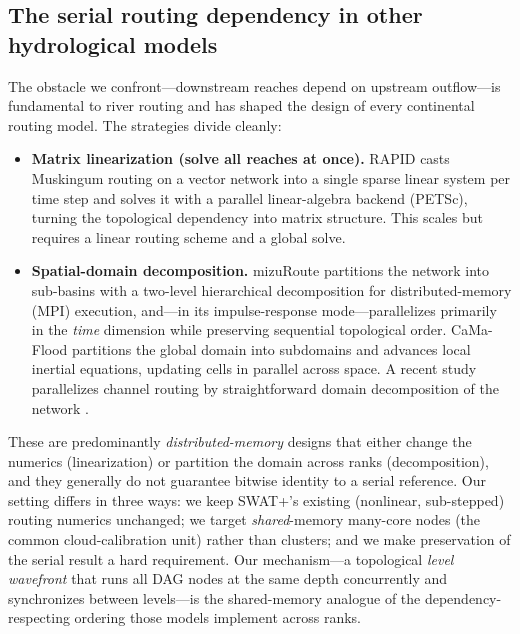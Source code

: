 \subsection{The serial routing dependency in other hydrological models}
The obstacle we confront---downstream reaches depend on upstream outflow---is fundamental to
river routing and has shaped the design of every continental routing model. The strategies
divide cleanly:
\begin{itemize}
  \item \textbf{Matrix linearization (solve all reaches at once).} RAPID
        \citep{David2011RAPID} casts Muskingum routing on a vector network into a single
        sparse linear system per time step and solves it with a parallel linear-algebra
        backend (PETSc), turning the topological dependency into matrix structure. This
        scales but requires a linear routing scheme and a global solve.
  \item \textbf{Spatial-domain decomposition.} mizuRoute
        \citep{Mizukami2021mizuRoute} partitions the network into sub-basins with a two-level
        hierarchical decomposition for distributed-memory (MPI) execution, and---in its
        impulse-response mode---parallelizes primarily in the \emph{time} dimension while
        preserving sequential topological order. CaMa-Flood \citep{Yamazaki2011CaMaFlood}
        partitions the global domain into subdomains and advances local inertial equations,
        updating cells in parallel across space. A recent study parallelizes channel routing
        by straightforward domain decomposition of the network \citep{Liu2023DomainDecompRouting}.
\end{itemize}
These are predominantly \emph{distributed-memory} designs that either change the numerics
(linearization) or partition the domain across ranks (decomposition), and they generally do
not guarantee bitwise identity to a serial reference. Our setting differs in three ways: we
keep SWAT+'s existing (nonlinear, sub-stepped) routing numerics unchanged; we target
\emph{shared}-memory many-core nodes (the common cloud-calibration unit) rather than clusters;
and we make preservation of the serial result a hard requirement. Our mechanism---a
topological \emph{level wavefront} that runs all DAG nodes at the same depth concurrently and
synchronizes between levels---is the shared-memory analogue of the dependency-respecting
ordering those models implement across ranks.

